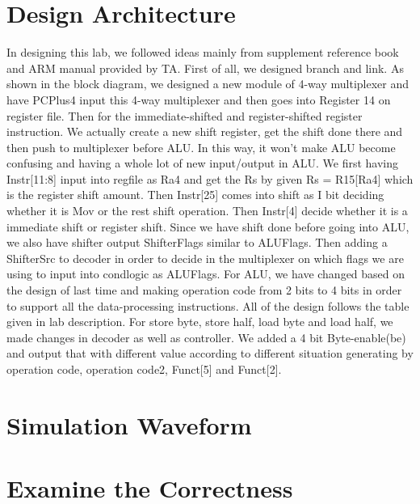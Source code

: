 \documentclass{article}
\begin{document}
\section{Design Architecture}

In designing this lab, we followed ideas mainly from supplement reference book and ARM manual provided by TA. First of all, we designed branch and link. As shown in the block diagram, we designed a new module of 4-way multiplexer and have PCPlus4 input this 4-way multiplexer and then goes into Register 14 on register file. 
\newline
Then for the immediate-shifted and register-shifted register instruction. We actually create a new shift register, get the shift done there and then push to multiplexer before ALU. In this way, it won't make ALU become confusing and having a whole lot of new input/output in ALU. We first having Instr[11:8] input into regfile as Ra4 and get the Rs by given Rs = R15[Ra4] which is the register shift amount. Then Instr[25] comes into shift as I bit deciding whether it is Mov or the rest shift operation. Then Instr[4] decide whether it is a immediate shift or register shift. Since we have shift done before going into ALU, we also have shifter output ShifterFlags similar to ALUFlags. Then adding a ShifterSrc to decoder in order to decide in the multiplexer on which flags we are using to input into condlogic as ALUFlags.
\newline
For ALU, we have changed based on the design of last time and making operation code from 2 bits to 4 bits in order to support all the data-processing instructions. All of the design follows the table given in lab description.
\newline
For store byte, store half, load byte and load half, we made changes in decoder as well as controller. We added a 4 bit Byte-enable(be) and output that with different value according to different situation generating by operation code, operation code2, Funct[5] and Funct[2].

\section{Simulation Waveform}


\section{Examine the Correctness}
\end{document}
